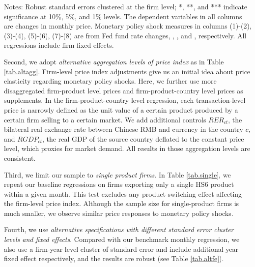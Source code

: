 \begin{table}[htbp]
{\begin{threeparttable}
\begin{tabular}{lcccccccc}
        \bottomrule
    \end{tabular}
        \begin{tablenotes}
            \footnotesize
            \item Notes: Robust standard errors clustered at the firm level;  *, **, and *** indicate significance at 10\%, 5\%, and 1\% levels. The dependent variables in all columns are changes in monthly price. Monetary policy shock measures in columns (1)-(2), (3)-(4), (5)-(6), (7)-(8) are from Fed fund rate changes, \cite{nakamura2018high}, \cite{acosta2022perceived}, and \cite{jarocinski2020deconstructing}, respectively. All regressions include firm fixed effects.
	\end{tablenotes}
    \end{threeparttable}
    }
    \label{tab.altmps}
\end{table}

Second, we adopt \textit{alternative aggregation levels of price index} as in Table \ref{tab.altagg}. Firm-level price index adjustments give us an initial idea about price elasticity regarding monetary policy shocks. Here, we further use more disaggregated firm-product level prices and firm-product-country level prices as supplements. In the firm-product-country level regression, each transaction-level price is narrowly defined as the unit value of a certain product produced by a certain firm selling to a certain market. We add additional controls $RER_{ct}$, the bilateral real exchange rate between Chinese RMB and currency in the country $c$, and $RGDP_{ct}$, the real GDP of the source country deflated to the constant price level, which proxies for market demand. All results in those aggregation levels are consistent. 

Third, we limit our sample to \textit{single product firms}. In Table \ref{tab.single}, we repeat our baseline regressions on firms exporting only a single HS6 product within a given month. This test excludes any product switching effect affecting the firm-level price index. Although the sample size for single-product firms is much smaller, we observe similar price responses to monetary policy shocks. 

Fourth, we use \textit{alternative specifications with different standard error cluster levels and fixed effects}. Compared with our benchmark monthly regression, we also use a firm-year level cluster of standard error and include additional year fixed effect respectively, and the results are robust (see Table \ref{tab.altfe}).

